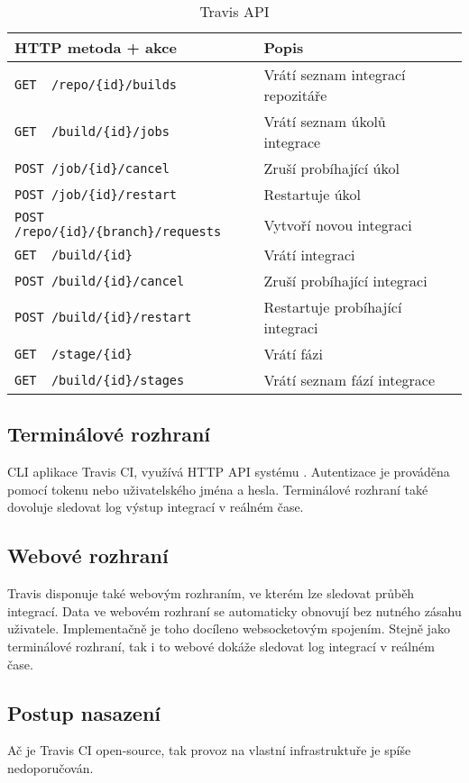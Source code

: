 \begin{table}[ht]
\centering
\fontsize{9.5}{11.5}\selectfont
\caption{Travis API}
\label{table:gitlab-api}
\begin{tabular}{|l|l|l|}
\hline
HTTP metoda + akce                                          & Popis \\ \hline
\verb|GET  /repo/{id}/builds|                               & Vrátí seznam integrací repozitáře      \\ \hline
\verb|GET  /build/{id}/jobs|                                & Vrátí seznam úkolů integrace      \\ \hline
\verb|POST /job/{id}/cancel|                                & Zruší probíhající úkol      \\ \hline
\verb|POST /job/{id}/restart|                               & Restartuje úkol      \\ \hline
\verb|POST /repo/{id}/{branch}/requests|                    & Vytvoří novou integraci      \\ \hline
\verb|GET  /build/{id}|                                     & Vrátí integraci      \\ \hline
\verb|POST /build/{id}/cancel|                              & Zruší probíhající integraci      \\ \hline
\verb|POST /build/{id}/restart|                             & Restartuje probíhající integraci      \\ \hline
\verb|GET  /stage/{id}|                                     & Vrátí fázi      \\ \hline
\verb|GET  /build/{id}/stages|                              & Vrátí seznam fází integrace      \\ \hline
\end{tabular}
\end{table}

\subsection{Terminálové rozhraní}

CLI aplikace Travis CI, využívá HTTP API systému \cite{travis_cli}.
Autentizace je prováděna pomocí tokenu nebo uživatelského jména a hesla.
Terminálové rozhraní také dovoluje sledovat log výstup integrací v reálném čase. 

\subsection{Webové rozhraní}

Travis disponuje také webovým rozhraním, ve kterém lze sledovat průběh integrací.
Data ve webovém rozhraní se automaticky obnovují bez nutného zásahu uživatele.
Implementačně je toho docíleno websocketovým spojením.
Stejně jako terminálové rozhraní, tak i to webové dokáže sledovat log integrací v reálném čase.

\subsection{Postup nasazení}

Ač je Travis CI open-source, tak provoz na vlastní infrastruktuře je spíše nedoporučován.
